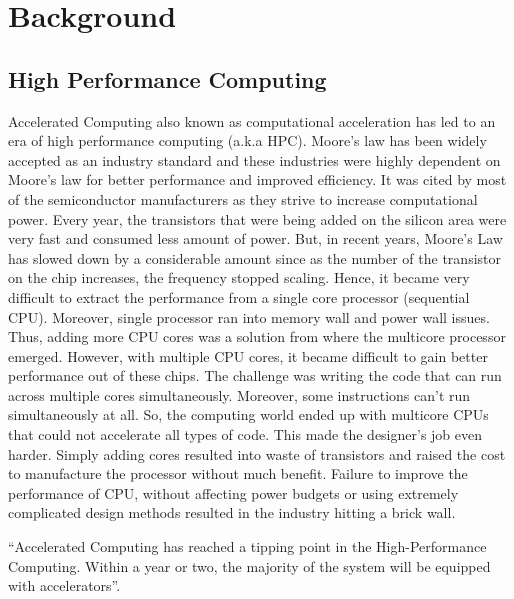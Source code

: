 
\newpage
\chapter{Background}

\section{High Performance Computing}

Accelerated Computing also known as computational acceleration has led to an era of high performance computing (a.k.a HPC). Moore's law has been widely accepted as an industry standard and these industries were highly dependent on Moore's law for better performance and improved efficiency. It was cited by most of the semiconductor manufacturers as they strive to increase computational power. Every year, the transistors that were being added on the silicon area were very fast and consumed less amount of power. But, in recent years, Moore's Law has slowed down by a considerable amount since as the number of the transistor on the chip increases, the frequency stopped scaling. Hence, it became very difficult to extract the performance from a single core processor (sequential CPU). Moreover, single processor ran into memory wall and power wall issues. Thus, adding more CPU cores was a solution from where the multicore processor emerged. However, with multiple CPU cores, it became difficult to gain better performance out of these chips. The challenge was writing the code that can run across multiple cores simultaneously. Moreover, some instructions can't run simultaneously at all. So, the computing world ended up with multicore CPUs that could not accelerate all types of code. This made the designer’s job even harder. Simply adding cores resulted into waste of transistors and raised the cost to manufacture the processor without much benefit. Failure to improve the performance of CPU, without affecting power budgets or using extremely complicated design methods resulted in the industry hitting a brick wall.

“Accelerated Computing has reached a tipping point in the High-Performance Computing. Within a year or two, the majority of the system will be equipped with accelerators”. \cite{3}

